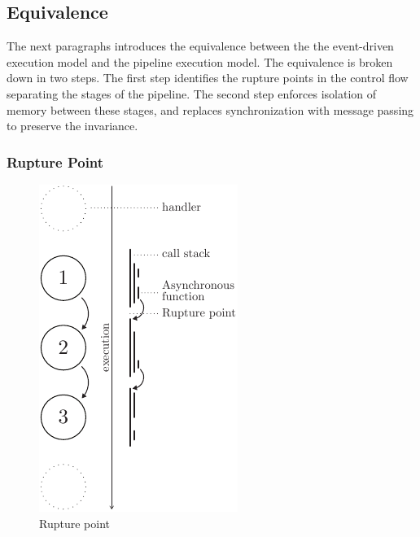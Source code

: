 


\subsection{Equivalence} \label{chapter4:equivalence}

The next paragraphs introduces the equivalence between the the event-driven execution model and the pipeline execution model.
The equivalence is broken down in two steps. %
The first step identifies the rupture points in the control flow separating the stages of the pipeline.
The second step enforces isolation of memory between these stages, and replaces synchronization with message passing to preserve the invariance.

\subsubsection{Rupture Point}

\begin{figure}
  \vspace{-10pt}
  \begin{center}
    \includegraphics[height=0.4\textwidth]{../resources/rupture-point.pdf}
    \caption{Rupture point}
    \label{fig:rupture-point}
  \end{center}
  \vspace{-10pt}
\end{figure}

